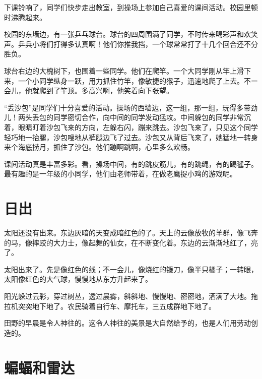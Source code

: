 \documentclass[12pt,UTF-8,openany]{ctexbook}
\begin{document}
\begin{large}
    
    下课铃响了，同学们快步走出教室，到操场上参加自己喜爱的课间活动。校园里顿时沸腾起来。
    
    校园的东墙边，有一张乒乓球台。球台的四周围满了同学，不时传来喝彩声和欢笑声。乒兵小将们打得多认真啊！他们你推我挡，一个球常常打了十几个回合还不分胜负。
    
    球台右边的大槐树下，也围着一些同学。他们在爬竿。一个大同学刚从竿上滑下来，一个小同学纵身一跃，用力抓住竹竿，像敏捷的猴子，迅速地爬了上去。不ー会儿，他就爬到了竿顶。多高兴啊，他笑着向下张望。
    
    “丢沙包”是同学们十分喜爱的活动。操场的西墙边，这一组，那一组，玩得多带劲儿！两头丢包的同学密切合作，向中间的同学发动猛攻。中间躲包的同学非常沉着，眼睛盯着沙包飞来的方向，左躲右闪，蹦来跳去。沙包飞来了，只见这个同学轻巧地一抬腿，沙包嗖地从裤腿边飞了过去。沙包又从背后飞来了，她猛地一转身来个海底捞月，抓住了沙包。他们蹦啊跳啊，心里多么欢畅。
    
    课间活动真是丰富多彩。看，操场中间，有的跳皮筋儿，有的跳绳，有的踢毽子。最有趣的是一年级的小同学，他们由老师带着，在做老鹰捉小鸡的游戏呢。
    
\end{large}



\chapter{日出}

\begin{large}
    
    太阳还没有出来。东边灰暗的天变成暗红色的了。天上的云像放牧的羊群，像飞奔的马，像摔跤的大力士，像起舞的仙女，在不断变化着。东边的云渐渐地红了，亮了。
    
    太阳出来了。先是像红色的线；不一会儿，像烧红的镰刀，像半只橘子；一转眼，太阳像红色的大气球，慢慢地从东方升起来了。
    
    阳光躲过云彩，穿过树丛，透过晨雾，斜斜地、慢慢地、密密地，洒满了大地。拖拉机突突地下地了。农民骑着自行车、摩托车，三五成群地下地了。
    
    田野的早晨是令人神往的。这令人神往的美景是大自然给予的，也是人们用劳动创造的。
    
\end{large}



\chapter{蝙蝠和雷达}
\end{document}
